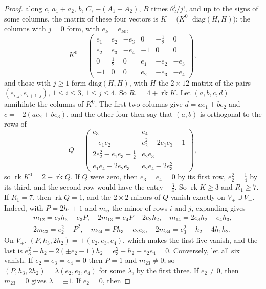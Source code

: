 \documentclass[11pt,reqno]{amsart}
\theoremstyle{plain}
\theoremstyle{definition}
\theoremstyle{remark}
\begin{document}
\begin{proof}
along $c$, $a_{1}+a_{2}$, $b$, $C$, $-(A_{1}+A_{2})$, $B$ times
$\theta_{2}^{j}/j!$, and up to the signs of some columns, the matrix of these
four vectors is $K=\bigl(K^{0}\,\big|\,\mathrm{diag}(H,H)\bigr)$: the columns
with $j=0$ form, with $e_{k}=e_{k0}$,
\[
  K^{0}=\begin{pmatrix}
  e_{1}&e_{2}&-e_{3}&0&-\frac12&0\\
  e_{2}&e_{3}&-e_{4}&-1&0&0\\
  0&\frac12&0&e_{1}&-e_{2}&-e_{3}\\
  -1&0&0&e_{2}&-e_{3}&-e_{4}
  \end{pmatrix},
\]
and those with $j\ge1$ form $\mathrm{diag}(H,H)$, with $H$ the $2\times12$
matrix of the pairs $(e_{i,j},e_{i+1,j})$, $1\le i\le3$, $1\le j\le4$. So
$R_{1}=4+\operatorname{rk}K$. Let
$(a,b,c,d)$ annihilate the columns of $K^{0}$. The first two columns give
$d=ae_{1}+be_{2}$ and $c=-2(ae_{2}+be_{3})$, and the other four then say that
$(a,b)$ is orthogonal to the rows of
\[
  Q=\begin{pmatrix}
  e_{3}&e_{4}\\
  -e_{1}e_{2}&e_{2}^{2}-2e_{1}e_{3}-1\\
  2e_{2}^{2}-e_{1}e_{3}-\frac12&e_{2}e_{3}\\
  e_{1}e_{4}-2e_{2}e_{3}&e_{2}e_{4}-2e_{3}^{2}
  \end{pmatrix},
\]
so $\operatorname{rk}K^{0}=2+\operatorname{rk}Q$. If $Q$ were zero, then
$e_{3}=e_{4}=0$ by its first row, $e_{2}^{2}=\frac14$ by its third, and the
second row would have the entry $-\frac34$. So $\operatorname{rk}K\ge3$ and
$R_{1}\ge7$. If $R_{1}=7$, then $\operatorname{rk}Q=1$, and the $2\times2$
minors of $Q$ vanish exactly on $V_{+}\cup V_{-}$. Indeed, with
$P=2h_{1}+1$ and $m_{ij}$ the minor of rows $i$ and $j$, expanding gives
\begin{gather*}
  m_{12}=e_{2}h_{3}-e_{3}P,\quad 2m_{13}=e_{4}P-2e_{2}h_{2},\quad
  m_{14}=2e_{3}h_{2}-e_{4}h_{3},\\
  2m_{23}=e_{2}^{2}-P^{2},\quad m_{24}=Ph_{3}-e_{2}e_{3},\quad
  2m_{34}=e_{3}^{2}-h_{2}-4h_{1}h_{2}.
\end{gather*}
On $V_{\pm}$, $(P,h_{3},2h_{2})=\pm(e_{2},e_{3},e_{4})$, which makes the first
five vanish, and the last is $e_{3}^{2}-h_{2}-2(\pm e_{2}-1)h_{2}=
e_{3}^{2}+h_{2}-e_{2}e_{4}=0$. Conversely, let all six vanish. If
$e_{2}=e_{3}=e_{4}=0$ then $P=1$ and $m_{23}\ne0$; so
$(P,h_{3},2h_{2})=\lambda(e_{2},e_{3},e_{4})$ for some $\lambda$, by the first
three. If $e_{2}\ne0$, then $m_{23}=0$ gives $\lambda=\pm1$. If $e_{2}=0$, then

\end{proof}
\end{document}
